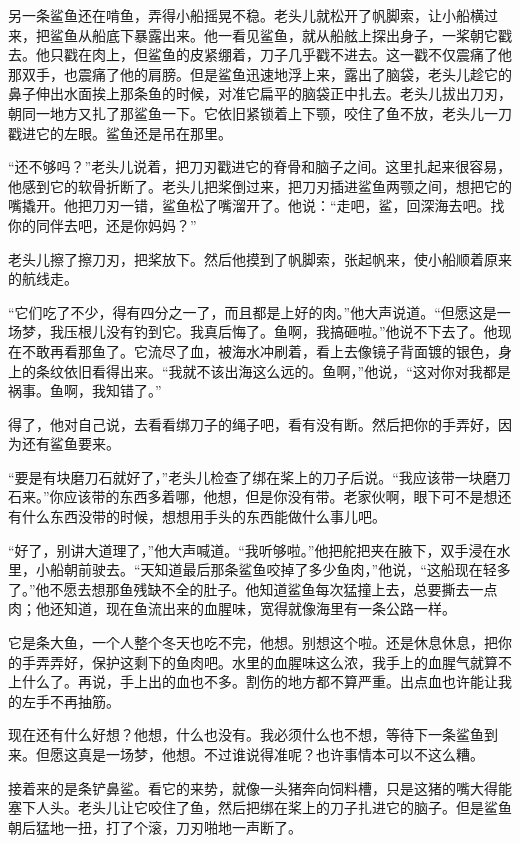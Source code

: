 \documentclass[12pt,UTF-8,openany]{ctexbook}
\begin{document}
\begin{large}
    另一条鲨鱼还在啃鱼，弄得小船摇晃不稳。老头儿就松开了帆脚索，让小船横过来，把鲨鱼从船底下暴露出来。他一看见鲨鱼，就从船舷上探出身子，一桨朝它戳去。他只戳在肉上，但鲨鱼的皮紧绷着，刀子几乎戳不进去。这一戳不仅震痛了他那双手，也震痛了他的肩膀。但是鲨鱼迅速地浮上来，露出了脑袋，老头儿趁它的鼻子伸出水面挨上那条鱼的时候，对准它扁平的脑袋正中扎去。老头儿拔出刀刃，朝同一地方又扎了那鲨鱼一下。它依旧紧锁着上下颚，咬住了鱼不放，老头儿一刀戳进它的左眼。鲨鱼还是吊在那里。
    
    “还不够吗？”老头儿说着，把刀刃戳进它的脊骨和脑子之间。这里扎起来很容易，他感到它的软骨折断了。老头儿把桨倒过来，把刀刃插进鲨鱼两颚之间，想把它的嘴撬开。他把刀刃一错，鲨鱼松了嘴溜开了。他说：“走吧，鲨，回深海去吧。找你的同伴去吧，还是你妈妈？”
    
    老头儿擦了擦刀刃，把桨放下。然后他摸到了帆脚索，张起帆来，使小船顺着原来的航线走。
    
    “它们吃了不少，得有四分之一了，而且都是上好的肉。”他大声说道。“但愿这是一场梦，我压根儿没有钓到它。我真后悔了。鱼啊，我搞砸啦。”他说不下去了。他现在不敢再看那鱼了。它流尽了血，被海水冲刷着，看上去像镜子背面镀的银色，身上的条纹依旧看得出来。“我就不该出海这么远的。鱼啊，”他说，“这对你对我都是祸事。鱼啊，我知错了。”
    
    得了，他对自己说，去看看绑刀子的绳子吧，看有没有断。然后把你的手弄好，因为还有鲨鱼要来。
    
    “要是有块磨刀石就好了，”老头儿检查了绑在桨上的刀子后说。“我应该带一块磨刀石来。”你应该带的东西多着哪，他想，但是你没有带。老家伙啊，眼下可不是想还有什么东西没带的时候，想想用手头的东西能做什么事儿吧。
    
    “好了，别讲大道理了，”他大声喊道。“我听够啦。”他把舵把夹在腋下，双手浸在水里，小船朝前驶去。“天知道最后那条鲨鱼咬掉了多少鱼肉，”他说，“这船现在轻多了。”他不愿去想那鱼残缺不全的肚子。他知道鲨鱼每次猛撞上去，总要撕去一点肉；他还知道，现在鱼流出来的血腥味，宽得就像海里有一条公路一样。
    
    它是条大鱼，一个人整个冬天也吃不完，他想。别想这个啦。还是休息休息，把你的手弄弄好，保护这剩下的鱼肉吧。水里的血腥味这么浓，我手上的血腥气就算不上什么了。再说，手上出的血也不多。割伤的地方都不算严重。出点血也许能让我的左手不再抽筋。
    
    现在还有什么好想？他想，什么也没有。我必须什么也不想，等待下一条鲨鱼到来。但愿这真是一场梦，他想。不过谁说得准呢？也许事情本可以不这么糟。
    
    接着来的是条铲鼻鲨。看它的来势，就像一头猪奔向饲料槽，只是这猪的嘴大得能塞下人头。老头儿让它咬住了鱼，然后把绑在桨上的刀子扎进它的脑子。但是鲨鱼朝后猛地一扭，打了个滚，刀刃啪地一声断了。
    

\end{large}
\end{document}
